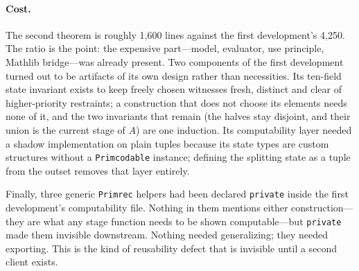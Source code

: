 \paragraph{Cost.}
The second theorem is roughly 1{,}600 lines against the first
development's 4{,}250.  The ratio is the point: the expensive
part---model, evaluator, use principle, Mathlib bridge---was already
present.  Two components of the first development turned out to be
artifacts of its own design rather than necessities.  Its ten-field state
invariant exists to keep freely chosen witnesses fresh, distinct and clear
of higher-priority restraints; a construction that does not choose its
elements needs none of it, and the two invariants that remain (the halves
stay disjoint, and their union is the current stage of $A$) are one
induction.  Its computability layer needed a shadow implementation on
plain tuples because its state types are custom structures without a
\texttt{Primcodable} instance; defining the splitting state as a tuple from
the outset removes that layer entirely.

Finally, three generic \texttt{Primrec} helpers had been declared
\texttt{private} inside the first development's computability file.
Nothing in them mentions either construction---they are what any stage
function needs to be shown computable---but \texttt{private} made them
invisible downstream.  Nothing needed generalizing; they needed exporting.
This is the kind of reusability defect that is invisible until a second
client exists.
